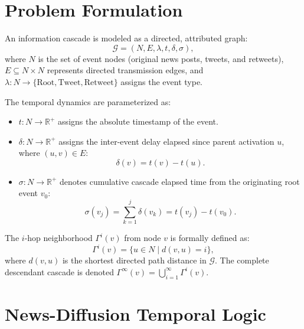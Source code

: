 \documentclass[10pt,twocolumn]{article}
\begin{document}
\section{Problem Formulation}

An information cascade is modeled as a directed, attributed graph:
\begin{equation}
\mathcal{G} = (N, E, \lambda, t, \delta, \sigma),
\end{equation}
where $N$ is the set of event nodes (original news posts, tweets, and retweets), $E \subseteq N \times N$ represents directed transmission edges, and $\lambda: N \to \{\text{Root}, \text{Tweet}, \text{Retweet}\}$ assigns the event type.

The temporal dynamics are parameterized as:
\begin{itemize}
    \item $t: N \to \mathbb{R}^+$ assigns the absolute timestamp of the event.
    \item $\delta: N \to \mathbb{R}^+$ assigns the inter-event delay elapsed since parent activation $u$, where $(u, v) \in E$:
    \begin{equation}
    \delta(v) = t(v) - t(u).
    \end{equation}
    \item $\sigma: N \to \mathbb{R}^+$ denotes cumulative cascade elapsed time from the originating root event $v_0$:
    \begin{equation}
    \sigma(v_j) = \sum_{k=1}^j \delta(v_k) = t(v_j) - t(v_0).
    \end{equation}
\end{itemize}

The $i$-hop neighborhood $\Gamma^i(v)$ from node $v$ is formally defined as:
\begin{equation}
\Gamma^i(v) = \{ u \in N \mid d(v, u) = i \},
\end{equation}
where $d(v, u)$ is the shortest directed path distance in $\mathcal{G}$. The complete descendant cascade is denoted $\Gamma^\infty(v) = \bigcup_{i=1}^\infty \Gamma^i(v)$.

\section{News-Diffusion Temporal Logic}
\end{document}
